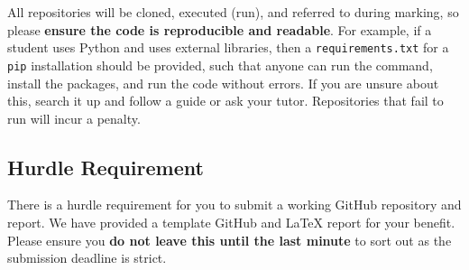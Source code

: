 \documentclass[12pt]{article}
\begin{document}
All repositories will be cloned, executed (run), and referred to during marking, so please \textbf{ensure the code is reproducible and readable}. For example, if a student uses Python and uses external libraries, then a \texttt{requirements.txt} for a \texttt{pip} installation should be provided, such that anyone can run the command, install the packages, and run the code without errors. If you are unsure about this, search it up and follow a guide or ask your tutor. Repositories that fail to run will incur a penalty.

\subsection*{Hurdle Requirement}
There is a hurdle requirement for you to submit a working GitHub repository and report. We have provided a template GitHub and LaTeX report for your benefit. Please ensure you \textbf{do not leave this until the last minute} to sort out as the submission deadline is strict. 
\end{document}
